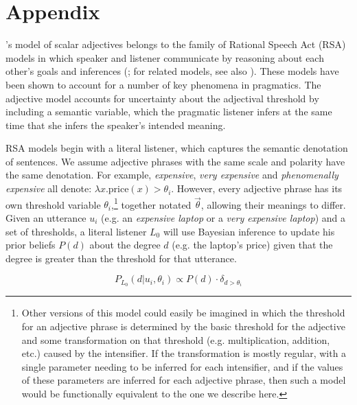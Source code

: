 \documentclass[10pt,letterpaper]{article}
\newcommand{\w}[1]{\emph{#1}}
\begin{document}
\setlength{\bibleftmargin}{.125in}
\setlength{\bibindent}{-\bibleftmargin}



\section{Appendix} \label{app:model}

 's model of scalar adjectives belongs to the family of Rational Speech Act (RSA) models in which speaker and listener communicate by  reasoning about each other's goals and inferences (; for related models, see also ). 
 These models have been shown to account for a number of key phenomena in pragmatics. The adjective model accounts for uncertainty about the adjectival threshold by including a semantic variable, which the pragmatic listener infers at the same time that she infers the speaker's intended meaning. 

RSA models begin with a literal listener, which captures the semantic denotation of sentences. 
We assume adjective phrases with the same scale and polarity have the same denotation. For example, \w{expensive}, \w{very expensive} and \w{phenomenally expensive} all denote: $\lambda x . \text{price}(x) > \theta_i$. %
However, every adjective phrase has its own threshold variable $\theta_i$,\footnote{Other versions of this model could easily be imagined in which the threshold for an adjective phrase is determined by the basic threshold for the adjective and some transformation on that threshold (e.g. multiplication, addition, etc.) caused by the intensifier. If the transformation is mostly regular, with a single parameter needing to be inferred for each intensifier, and if the values of these parameters are inferred for each adjective phrase, then such a model would be functionally equivalent to the one we describe here.} together notated $\vec{\theta}$, allowing their meanings to differ.
Given an utterance $u_i$ (e.g. an \w{expensive laptop} or a \w{very expensive laptop}) and a set of thresholds, a literal listener $L_0$ will use Bayesian inference to update his prior beliefs $P(d)$ about the degree $d$ (e.g. the laptop's price) given that the degree is greater than the threshold for that utterance.

$$P_{L_0}(d|u_i, \theta_i) \propto P(d) \cdot \delta_{d > \theta_i}$$
\end{document}
